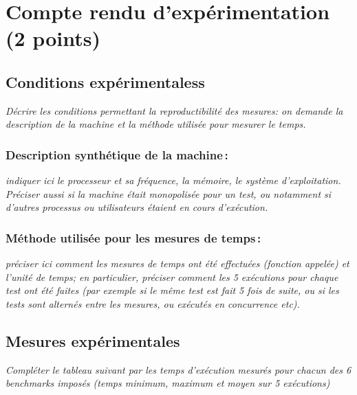 \documentclass[a4paper, 10pt, french]{article}
\begin{document}
\section{Compte rendu d'expérimentation (2 points)}
  \subsection{Conditions expérimentaless}
     {\em Décrire les conditions permettant la reproductibilité des mesures: on demande la description
      de la machine et la méthode utilisée pour mesurer le temps.
     }

    \subsubsection{Description synthétique de la machine\,:} 
      {\em indiquer ici le  processeur et sa fréquence, la mémoire, le système d'exploitation. 
       Préciser aussi si la machine était monopolisée pour un test, ou notamment si 
       d'autres processus ou utilisateurs étaient en cours d'exécution. 
      } 

    \subsubsection{Méthode utilisée pour les mesures de temps\,: } 
      {\em préciser ici  comment les mesures de temps ont été effectuées (fonction appelée) et l'unité de temps; en particulier, 
       préciser comment les 5 exécutions pour chaque test ont été faites (par exemple si le même test est fait 5 fois de suite, ou si les tests sont alternés entre
       les mesures, ou exécutés en concurrence etc). 
      }

  \subsection{Mesures expérimentales}
    {\em Compléter le tableau suivant par les temps d'exécution mesurés pour chacun des 6 benchmarks imposés
              (temps minimum, maximum et moyen sur 5 exécutions)
    }
\end{document}
